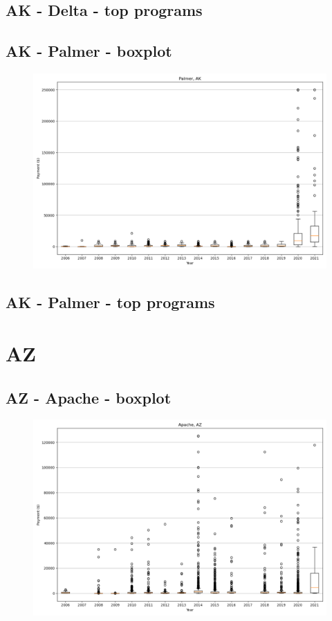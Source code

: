 \subsection*{AK - Delta - top programs}

\newpage
\subsection*{AK - Palmer - boxplot}
\begin{figure}[h]
\centering
\includegraphics[width=7in]{../output/boxplots/counties/Palmer-AK_boxplot.png}
\end{figure}


\subsection*{AK - Palmer - top programs}

\newpage
\section*{AZ}
\subsection*{AZ - Apache - boxplot}
\begin{figure}[h]
\centering
\includegraphics[width=7in]{../output/boxplots/counties/Apache-AZ_boxplot.png}
\end{figure}


